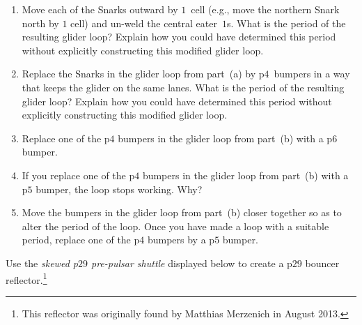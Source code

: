 \begin{multicols}{2}
\begin{problem}
		\begin{enumerate}[label=\bf\color{ocre}(\alph*)]
			\item Move each of the Snarks outward by $1$~cell (e.g., move the northern Snark north by $1$ cell) and un-weld the central eater~$1$s. What is the period of the resulting glider loop? Explain how you could have determined this period without explicitly constructing this modified glider loop.
			
			\item Replace the Snarks in the glider loop from part~(a) by p$4$~bumpers in a way that keeps the glider on the same lanes. What is the period of the resulting glider loop? Explain how you could have determined this period without explicitly constructing this modified glider loop.
			
			\item Replace one of the p$4$ bumpers in the glider loop from part~(b) with a p$6$ bumper.
			
			\item If you replace one of the p$4$ bumpers in the glider loop from part~(b) with a p$5$ bumper, the loop stops working. Why?
			
			\item Move the bumpers in the glider loop from part~(b) closer together so as to alter the period of the loop. Once you have made a loop with a suitable period, replace one of the p$4$ bumpers by a p$5$ bumper.
			
			\noindent\begin{minipage}{\linewidth}
				\centering
				\label{fig:minimum_snark_loop}\medskip
			\end{minipage}
		\end{enumerate}
	\end{problem}
	
	
	\mfilbreak
	
	
	\begin{problem}\label{exer:p29_pipsquirter}
		Use the \emph{skewed p$29$ pre-pulsar shuttle} displayed below to create a p$29$ bouncer reflector.\footnote{This reflector was originally found by Matthias Merzenich in August 2013.}
		
		\begin{center}
		\end{center}
	\end{problem}
	

\end{multicols}
